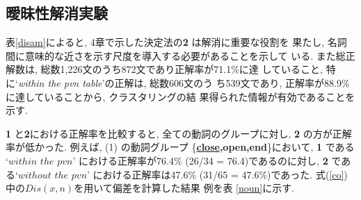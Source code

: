 \subsection{曖昧性解消実験}

表\ref{disam}によると, 4章で示した決定法の{\bf 2} は解消に重要な役割を
果たし, 名詞間に意味的な近さを示す尺度を導入する必要があることを示して
いる.  また総正解数は, 総数1,226文のうち872文であり正解率が71.1\%に達
していること, 特に`{\it within the pvn table}'の正解は, 総数606文のう
ち539文であり, 正解率が88.9\%に達していることから, クラスタリングの結
果得られた情報が有効であることを示す.

{\bf 1} と{\bf 2}における正解率を比較すると, 全ての動詞のグループに対し,
{\bf 2} の方が正解率が低かった.  例えば, (1) の動詞グループ
\{{\bf \underline{close},open,end}\}において, {\bf 1} である `$within$
$the$ $pvn$' における正解率が76.4\% (26/34 = 76.4)であるのに対し, {\bf
2} である`$without$ $the$ $pvn$' における正解率は47.6\% (31/65 =
47.6\%)であった.  式(\ref{co})中の$Dis(x,n)$を用いて偏差を計算した結果
例を表
\ref{noun}に示す.

